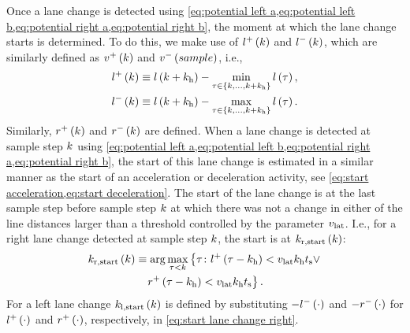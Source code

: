 Once a lane change is detected using \cref{eq:potential left a,eq:potential left b,eq:potential right a,eq:potential right b}, the moment at which the lane change starts is determined. To do this, we make use of $l^{+}\left(k\right)$ and $l^{-}\left(k\right)$, which are similarly defined as $v^{+}\left(k\right)$ and $v^{-}\left(sample\right)$, i.e.,
\begin{align}
	l^{+}\left(k\right) \equiv l\left(k+k_{\mathrm{h}}\right) - \min_{\tau \in \left\{k, \ldots, k+k_{\mathrm{h}}\right\}} l\left(\tau\right),\\
	l^{-}\left(k\right) \equiv l\left(k+k_{\mathrm{h}}\right) - \max_{\tau \in \left\{k, \ldots, k+k_{\mathrm{h}}\right\}} l\left(\tau\right).
\end{align}
Similarly, $r^{+}\left(k\right)$ and $r^{-}\left(k\right)$ are defined. 
When a lane change is detected at sample step $k$ using \cref{eq:potential left a,eq:potential left b,eq:potential right a,eq:potential right b}, the start of this lane change is estimated in a similar manner as the start of an acceleration or deceleration activity, see \cref{eq:start acceleration,eq:start deceleration}. 
The start of the lane change is at the last sample step before sample step $k$ at which there was not a change in either of the line distances larger than a threshold controlled by the parameter $v_{\mathrm{lat}}$. 
I.e., for a right lane change detected at sample step $k$, the start is at $k_\mathrm{r,start}\left(k\right)$:
\begin{multline} \label{eq:start lane change right}
	k_\mathrm{r,start}\left(k\right) \equiv \arg \max_{\tau < k} \left\{ \tau\colon l^{+}\left(\tau-k_{\mathrm{h}}\right) < v_{\mathrm{lat}}k_{\mathrm{h}}t_\mathrm{s} \lor \right.\\
	\left. r^{+}\left(\tau-k_{\mathrm{h}}\right) < v_{\mathrm{lat}}k_{\mathrm{h}}t_\mathrm{s} \right\}.
\end{multline}
For a left lane change $k_\mathrm{l,start}\left(k\right)$ is defined by substituting $-l^{-}\left(\cdot\right)$ and $-r^{-}\left(\cdot\right)$ for $l^{+}\left(\cdot\right)$ and $r^{+}\left(\cdot\right)$, respectively, in \cref{eq:start lane change right}.

